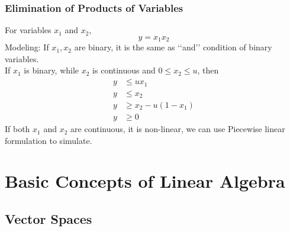 				\subsection{Elimination of Products of Variables}
					For variables $x_1$ and $x_2$,
					\begin{equation}y = x_1 x_2\end{equation}
					Modeling: If $x_1, x_2$ are binary, it is the same as \lq\lq{}and\rq\rq{} condition of binary variables.\\
					If $x_1$ is binary, while $x_2$ is continuous and $0 \le x_2 \le u$, then
					\begin{align}
						y &\le ux_1  \\
						y &\le x_2  \\
						y &\ge x_2 - u(1- x_1)  \\
						y &\ge 0 
					\end{align}
					If both $x_1$ and $x_2$ are continuous, it is non-linear, we can use Piecewise linear formulation to simulate.

		\chapter{Basic Concepts of Linear Algebra}
			\section{Vector Spaces}
